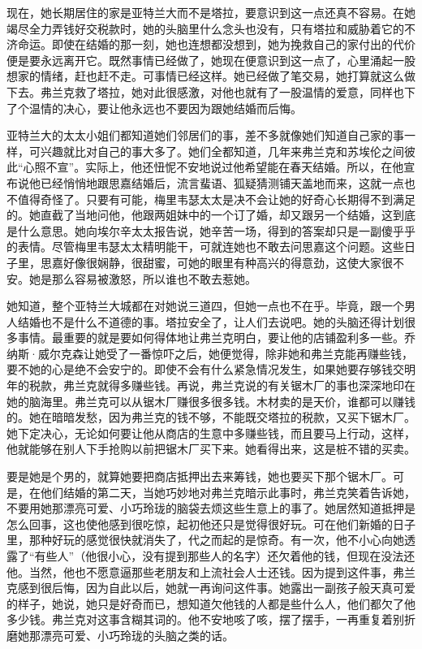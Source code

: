 \par 现在，她长期居住的家是亚特兰大而不是塔拉，要意识到这一点还真不容易。在她竭尽全力弄钱好交税款时，她的头脑里什么念头也没有，只有塔拉和威胁着它的不济命运。即使在结婚的那一刻，她也连想都没想到，她为挽救自己的家付出的代价便是要永远离开它。既然事情已经做了，她现在便意识到这一点了，心里涌起一股想家的情绪，赶也赶不走。可事情已经这样。她已经做了笔交易，她打算就这么做下去。弗兰克救了塔拉，她对此很感激，对他也就有了一股温情的爱意，同样也下了个温情的决心，要让他永远也不要因为跟她结婚而后悔。
\par 亚特兰大的太太小姐们都知道她们邻居们的事，差不多就像她们知道自己家的事一样，可兴趣就比对自己的事大多了。她们全都知道，几年来弗兰克和苏埃伦之间彼此“心照不宣”。实际上，他还忸怩不安地说过他希望能在春天结婚。所以，在他宣布说他已经悄悄地跟思嘉结婚后，流言蜚语、狐疑猜测铺天盖地而来，这就一点也不值得奇怪了。只要有可能，梅里韦瑟太太是决不会让她的好奇心长期得不到满足的。她直截了当地问他，他跟两姐妹中的一个订了婚，却又跟另一个结婚，这到底是什么意思。她向埃尔辛太太报告说，她辛苦一场，得到的答案却只是一副傻乎乎的表情。尽管梅里韦瑟太太精明能干，可就连她也不敢去问思嘉这个问题。这些日子里，思嘉好像很娴静，很甜蜜，可她的眼里有种高兴的得意劲，这使大家很不安。她是那么容易被激怒，所以谁也不敢去惹她。
\par 她知道，整个亚特兰大城都在对她说三道四，但她一点也不在乎。毕竟，跟一个男人结婚也不是什么不道德的事。塔拉安全了，让人们去说吧。她的头脑还得计划很多事情。最重要的就是要如何得体地让弗兰克明白，要让他的店铺盈利多一些。乔纳斯·威尔克森让她受了一番惊吓之后，她便觉得，除非她和弗兰克能再赚些钱，要不她的心是绝不会安宁的。即使不会有什么紧急情况发生，如果她要存够钱交明年的税款，弗兰克就得多赚些钱。再说，弗兰克说的有关锯木厂的事也深深地印在她的脑海里。弗兰克可以从锯木厂赚很多很多钱。木材卖的是天价，谁都可以赚钱的。她在暗暗发愁，因为弗兰克的钱不够，不能既交塔拉的税款，又买下锯木厂。她下定决心，无论如何要让他从商店的生意中多赚些钱，而且要马上行动，这样，他就能够在别人下手抢购以前把锯木厂买下来。她看得出来，这是桩不错的买卖。
\par 要是她是个男的，就算她要把商店抵押出去来筹钱，她也要买下那个锯木厂。可是，在他们结婚的第二天，当她巧妙地对弗兰克暗示此事时，弗兰克笑着告诉她，不要用她那漂亮可爱、小巧玲珑的脑袋去烦这些生意上的事了。她居然知道抵押是怎么回事，这也使他感到很吃惊，起初他还只是觉得很好玩。可在他们新婚的日子里，那种好玩的感觉很快就消失了，代之而起的是惊奇。有一次，他不小心向她透露了“有些人”（他很小心，没有提到那些人的名字）还欠着他的钱，但现在没法还他。当然，他也不愿意逼那些老朋友和上流社会人士还钱。因为提到这件事，弗兰克感到很后悔，因为自此以后，她就一再询问这件事。她露出一副孩子般天真可爱的样子，她说，她只是好奇而已，想知道欠他钱的人都是些什么人，他们都欠了他多少钱。弗兰克对这事含糊其词的。他不安地咳了咳，摆了摆手，一再重复着别折磨她那漂亮可爱、小巧玲珑的头脑之类的话。

